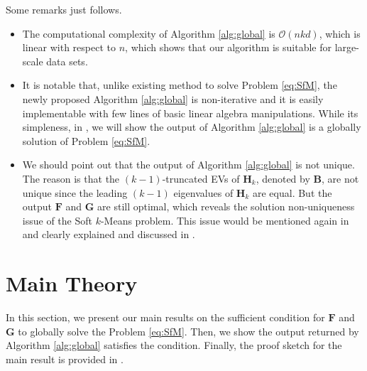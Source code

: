 \documentclass[journal]{IEEEtran}
\begin{document}
\begin{remark} Some remarks just follows.
	
	\begin{itemize}
		\item The computational complexity of Algorithm \ref{alg:global} is $\mathcal{O}(nkd)$, which is linear with respect to $n$, 
		which shows that our algorithm is suitable for large-scale data sets.
		\item It is notable that, unlike existing method to solve Problem \eqref{eq:SfM}, the newly proposed Algorithm \ref{alg:global} is non-iterative and it is easily implementable with few lines of basic linear algebra manipulations.
		While its simpleness, in , we will show the output of Algorithm \ref{alg:global} is a globally solution of Problem \eqref{eq:SfM}.
		\item We should point out that the output of Algorithm \ref{alg:global} is not unique.
		The reason is that the $(k-1)$-truncated EVs of $\mathbf{H}_k$, denoted by $\mathbf{B}$, are not unique since the leading $(k-1)$ eigenvalues of $\mathbf{H}_k$ are equal. But the output $\mathbf{F}$ and $\mathbf{G}$ are still optimal, which reveals the solution non-uniqueness issue of the Soft $k$-Means problem.
		This issue would be mentioned again in  and clearly explained and discussed in .
	\end{itemize}
	
	
	
\end{remark}
%
\section{Main Theory} \label{sec:mainTheory} \label{sec:theory}
In this section, we present our main results on the sufficient condition for $\mathbf{F}$ and $\mathbf{G}$ to globally solve the Problem \eqref{eq:SfM}. 
Then, we show the output returned by Algorithm \ref{alg:global} satisfies the condition.
Finally, the proof sketch for the main result is provided in .
\end{document}
